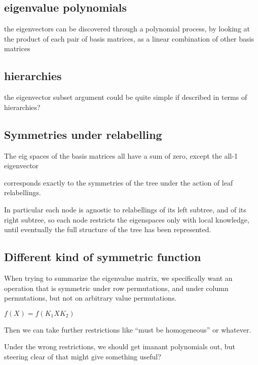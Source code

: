 \documentclass{article}
\begin{document}
\subsection{eigenvalue polynomials}

the eigenvectors can be discovered through a polynomial process, by looking at
the product of each pair of basis matrices, as a linear combination of other
basis matrices

\subsection{hierarchies}

the eigenvector subset argument could be quite simple if described in terms of
hierarchies?

\subsection{Symmetries under relabelling}

The eig spaces of the basis matrices all have a sum of zero, except the all-1
eigenvector

corresponds exactly to the symmetries of the tree under the action of leaf
relabellings.

In particular each node is agnostic to relabellings of its left subtree, and of
its right subtree, so each node restricts the eigenspaces only with local
knowledge, until eventually the full structure of the tree has been
represented.

\subsection{Different kind of symmetric function}

When trying to summarize the eigenvalue matrix, we specifically want an
operation that is symmetric under row permutations, and under column
permutations, but not on arbitrary value permutations.

$f(X) = f(K_1XK_2)$

Then we can take further restrictions like ``must be homogeneous'' or whatever.

Under the wrong restrictions, we should get imanant polynomials out, but
steering clear of that might give something useful?
\end{document}
